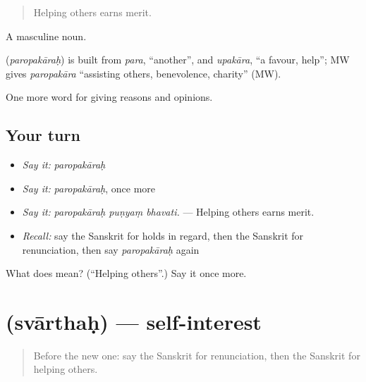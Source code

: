 \begin{quote}
Helping others earns merit.
\end{quote}

A masculine noun.

\begin{cousinweb}
\textbf{} (\emph{paropakāraḥ}) is built from \emph{para}, \textquotedblleft{}another\textquotedblright{}, and \emph{upakāra}, \textquotedblleft{}a favour, help\textquotedblright{}; MW gives \emph{paropakāra} \textquotedblleft{}assisting others, benevolence, charity\textquotedblright{} (MW).
\end{cousinweb}

\begin{grammarlens}[title={What you've built}]
One more word for giving reasons and opinions.
\end{grammarlens}

\subsection*{Your turn}
\begin{itemize}
\raggedright
  \item \emph{Say it:} \emph{paropakāraḥ}
  \item \emph{Say it:} \emph{paropakāraḥ}, once more
  \item \emph{Say it:} \emph{paropakāraḥ puṇyaṃ bhavati.} — Helping others earns merit.
  \item \emph{Recall:} say the Sanskrit for holds in regard, then the Sanskrit for renunciation, then say \emph{paropakāraḥ} again
\end{itemize}

\begin{tcolorbox}[breakable,colback=teal!4,colframe=teal!35!black,title={Before you move on}]
What does  mean? (\textquotedblleft{}Helping others\textquotedblright{}.) Say it once more.
\end{tcolorbox}
\section[\texorpdfstring{\sk{स्वार्थः} (svārthaḥ)}{स्वार्थः (svārthaḥ)}]{ (svārthaḥ) — self-interest}

\label{lesson:SA-C359-svarthah}



\begin{quote}
Before the new one: say the Sanskrit for renunciation, then the Sanskrit for helping others.
\end{quote}

